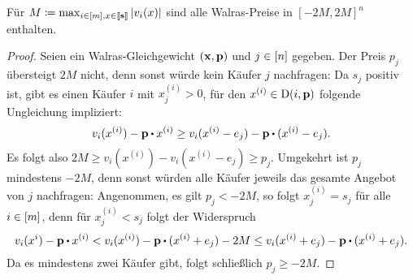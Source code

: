 \begin{lemma}\label{lemma-prices-bounded-M}
	Für $M\coloneqq \max_{i\in\left[ m \right], x\in\left\llbracket \mathbf{s} \right\rrbracket} \left\lvert v_i(x) \right\rvert$ sind alle Walras-Preise in $[-2M, 2M]^n$ enthalten.
\end{lemma}
\begin{proof}
	Seien ein Walras-Gleichgewicht $(\mathbf{x}, \mathbf{p})$ und $j\in\left[ n \right]$ gegeben.
	Der Preis $p_j$ übersteigt $2M$ nicht, denn sonst würde kein Käufer $j$ nachfragen:
	Da $s_j$ positiv ist, gibt es einen Käufer $i$ mit $x^{(i)}_j > 0$, für den $x^{(i)} \in\operatorname{D}(i, \mathbf{p})$ folgende Ungleichung impliziert:
	\[
	v_i(x^{(i)}) - \fp \bcdot x^{(i)} \geq v_i(x^{(i)} - e_j) - \fp \bcdot ( x^{(i)} - e_j ).
	 \]
	 Es folgt also $2M \geq v_i(x^{(i)}) - v_i(x^{(i)} - e_j) \geq p_j$.
	 Umgekehrt ist $p_j$ mindestens $-2M$, denn sonst würden alle Käufer jeweils das gesamte Angebot von $j$ nachfragen:
	 Angenommen, es gilt $p_j < -2M$, so folgt $x^{(i)}_j = s_j$ für alle $i\in\left[ m \right]$, denn für $x^{(i)}_j < s_j$ folgt der Widerspruch
	 \[ 
	 	v_i(x^{i})  - \fp \bcdot x^{(i)} < v_i(x^{(i)}) - \fp \bcdot (x^{(i)} + e_j) - 2M \leq v_i(x^{(i)} + e_j) - \fp \bcdot (x^{(i)} + e_j).
	 \]
	 Da es mindestens zwei Käufer gibt, folgt schließlich $p_j \geq -2M$.
\end{proof}

